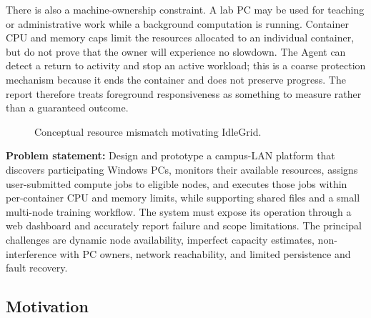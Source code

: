 \documentclass{article}
\begin{document}
There is also a machine-ownership constraint. A lab PC may be used for teaching or administrative work while a background computation is running. Container CPU and memory caps limit the resources allocated to an individual container, but do not prove that the owner will experience no slowdown. The Agent can detect a return to activity and stop an active workload; this is a coarse protection mechanism because it ends the container and does not preserve progress. The report therefore treats foreground responsiveness as something to measure rather than a guaranteed outcome.

\begin{figure}[htbp]
\centering
{}
\caption{Conceptual resource mismatch motivating IdleGrid.}
\label{fig:problem-context}
\end{figure}

\textbf{Problem statement:} Design and prototype a campus-LAN platform that discovers participating Windows PCs, monitors their available resources, assigns user-submitted compute jobs to eligible nodes, and executes those jobs within per-container CPU and memory limits, while supporting shared files and a small multi-node training workflow. The system must expose its operation through a web dashboard and accurately report failure and scope limitations. The principal challenges are dynamic node availability, imperfect capacity estimates, non-interference with PC owners, network reachability, and limited persistence and fault recovery.

	
	\subsection{Motivation}
\end{document}
